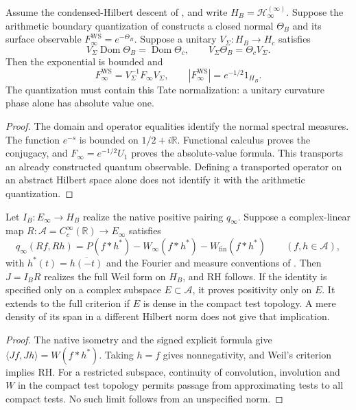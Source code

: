 \begin{theorem}
\label{v4-arith:w10-a:thm:wilson-surface-compat}
Assume the condensed-Hilbert descent of
, and write
\(H_B=\mathcal H^{(\infty)}_\infty\).
Suppose the arithmetic boundary quantization of
 constructs a closed normal
\(\Theta_B\) and its surface observable
\(F_\infty^{\mathrm{WS}}=e^{-\Theta_B}\).
Suppose a unitary \(V_\Sigma:H_B\to H_c\) satisfies
\[
 V_\Sigma\operatorname{Dom}\Theta_B=\operatorname{Dom}\Theta_c,
 \qquad V_\Sigma\Theta_B=\Theta_cV_\Sigma.
\]
Then the exponential is bounded and
\[
 F_\infty^{\mathrm{WS}}=V_\Sigma^{-1}F_\infty V_\Sigma,
 \qquad |F_\infty^{\mathrm{WS}}|=e^{-1/2}1_{H_B}.
\]
The quantization must contain this Tate normalization: a unitary
curvature phase alone has absolute value one.
\end{theorem}
\begin{proof}
The domain and operator equalities identify the normal spectral
measures. The function \(e^{-s}\) is bounded on
\(1/2+i\mathbb R\). Functional calculus proves the conjugacy, and
\(F_\infty=e^{-1/2}U_1\) proves the absolute-value formula.
This transports an already constructed quantum observable.
Defining a transported operator on an abstract Hilbert space alone
does not identify it with the arithmetic quantization.
\end{proof}

\begin{proposition}
\label{v4-arith:consumer94:native-Weil}
Let \(I_B:E_\infty\to H_B\) realize the native positive pairing
\(q_\infty\). Suppose a complex-linear map
\(R:\mathscr A=C_c^\infty(\mathbb R)\to E_\infty\) satisfies
\[
 q_\infty(Rf,Rh)=P(f*h^*)-W_\infty(f*h^*)-W_{\mathrm{fin}}(f*h^*)
 \qquad(f,h\in\mathscr A),
\]
with \(h^*(t)=\overline{h(-t)}\) and the Fourier and measure
conventions of .
Then \(J=I_BR\) realizes the full Weil form on \(H_B\), and RH follows.
If the identity is specified only on a complex subspace
\(E\subset\mathscr A\), it proves positivity only on \(E\).
It extends to the full criterion if \(E\) is dense in the compact
test topology. A mere density of its span in a different Hilbert
norm does not give that implication.
\end{proposition}
\begin{proof}
The native isometry and the signed explicit formula give
\(\langle Jf,Jh\rangle=W(f*h^*)\). Taking \(h=f\) gives
nonnegativity, and Weil's criterion implies RH. For a restricted
subspace, continuity of convolution, involution and \(W\) in the
compact test topology permits passage from approximating tests to
all compact tests. No such limit follows from an unspecified norm.
\end{proof}

